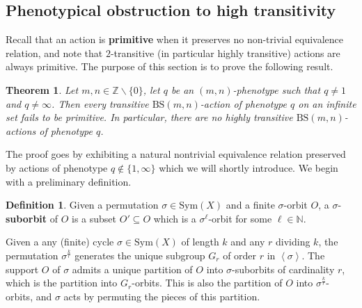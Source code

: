 \documentclass[12pt]{article}
\numberwithin{equation}{section}
\newtheorem{theorem}[equation]{Theorem}
\theoremstyle{definition}
\newtheorem{definition}[equation]{Definition}
\def\defin#1{\textbf{#1}}
\newcommand{\N}{\mathbb{N}}
\newcommand{\Z}{\mathbb{Z}}
\newcommand{\la}{\left\langle}
\newcommand{\ra}{\right\rangle}
\newcommand\BSo{\mathrm{BS}}
\newcommand{\Sym}{\mathrm{Sym}}
\begin{document}
\subsection{Phenotypical obstruction to high transitivity}\label{Sect: phenotypical obstruction}

Recall that an action is \defin{primitive} when it preserves no non-trivial equivalence 
relation, and note that \(2\)-transitive (in particular highly transitive) actions
are always primitive. The purpose of this section is to prove the following result.

\begin{theorem}\label{thm: phenotype and non primitivity}
	Let \( m,n\in\Z\smallsetminus\{0\} \), let \( q \) be an \( (m,n) \)-phenotype 
	such that \(q\neq 1\) and \(q\neq\infty\). 
	Then every transitive \(\BSo(m,n)\)-action of phenotype \(q\) on an infinite set 
	fails to be primitive. 
	In particular, there are no highly transitive  \(\BSo(m,n)\)-actions of phenotype \(q\).
\end{theorem}
	The proof goes by exhibiting a natural nontrivial equivalence relation 
	preserved by actions of phenotype \(q\not\in\{1,\infty\}\) which we will shortly introduce.
    We begin with a preliminary definition. 
    
    \begin{definition}
    Given a permutation $\sigma\in\Sym(X)$ and a finite $\sigma$-orbit $O$, 
	a $\sigma$-\defin{suborbit} of $O$ is a subset $O'\subseteq O$ which is a $\sigma^\ell$-orbit for some $\ell\in\N$. 
    \end{definition}
    Given a any (finite) cycle $\sigma\in\Sym(X)$ of length $k$ and any $r$ dividing $k$,
    the permutation $\sigma^{\frac{k}{r}}$ generates the unique subgroup $G_r$ 
    of order $r$ in $\la\sigma\ra$.
    The support $O$ of $\sigma$ admits a unique partition of $O$ into $\sigma$-suborbits of cardinality $r$,
    which is the partition into $G_r$-orbits.
    This is also the partition of $O$ into $\sigma^{\frac{k}{r}}$-orbits, and $\sigma$ acts by permuting the pieces of this partition.
    
\end{document}
